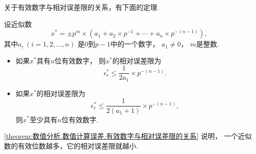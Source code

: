 关于有效数字与相对误差限的关系，有下面的定理.
\begin{theorem}\label{theorem:数值分析.数值计算误差.有效数字与相对误差限的关系}
设近似数\begin{equation*}
	x^*
	= \pm p^m \times (
		a_1
		+ a_2 \times p^{-1}
		+ \dotsb
		+ a_n \times p^{-(n-1)}
	),
\end{equation*}
其中\(a_i\ (i=1,2,\dotsc,n)\)
是\(0\)到\(p-1\)中的一个数字，
\(a_1\neq0\)，
\(m\)是整数.
\begin{itemize}
	\item 如果\(x^*\)具有\(n\)位有效数字，
	则\(x^*\)的相对误差限为\begin{equation}
		\epsilon^*_r
		\leq \frac1{2 a_1} \times p^{-(n-1)}.
	\end{equation}

	\item 如果\(x^*\)的相对误差限为\begin{equation*}
		\epsilon^*_r
		\leq \frac1{2(a_1+1)} \times p^{-(n-1)},
	\end{equation*}
	则\(x^*\)至少具有\(n\)位有效数字.
\end{itemize}
\end{theorem}
\cref{theorem:数值分析.数值计算误差.有效数字与相对误差限的关系} 说明，
一个近似数的有效位数越多，它的相对误差限就越小.
